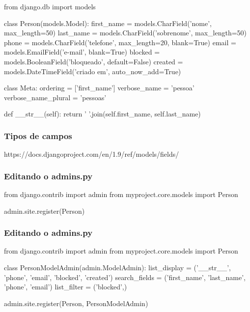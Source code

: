 \documentclass{beamer}
\begin{document}
{\begin{frame}[fragile]
\begin{pythoncode}
from django.db import models

class Person(models.Model):
    first_name = models.CharField('nome', max_length=50)
    last_name = models.CharField('sobrenome', max_length=50)
    phone = models.CharField('telefone', max_length=20, blank=True)
    email = models.EmailField('e-mail', blank=True)
    blocked = models.BooleanField('bloqueado', default=False)
    created = models.DateTimeField('criado em', auto_now_add=True)

    class Meta:
        ordering = ['first_name']
        verbose_name = 'pessoa'
        verbose_name_plural = 'pessoas'

    def __str__(self):
        return ' '.join(self.first_name, self.last_name)
\end{pythoncode}

\end{frame}

\begin{frame}\frametitle{Tipos de campos}
  \begin{center}
    \large https://docs.djangoproject.com/en/1.9/ref/models/fields/
  \end{center}
\end{frame}

\begin{frame}[fragile]\frametitle{Editando o admins.py}

\begin{pythoncode}
from django.contrib import admin
from myproject.core.models import Person

admin.site.register(Person)
\end{pythoncode}

\end{frame}

\begin{frame}[fragile]\frametitle{Editando o admins.py}

\begin{pythoncode}
from django.contrib import admin
from myproject.core.models import Person

class PersonModelAdmin(admin.ModelAdmin):
    list_display = ('__str__', 'phone', 'email',
                    'blocked', 'created')
    search_fields = ('first_name', 'last_name',
                     'phone', 'email')
    list_filter = ('blocked',)

admin.site.register(Person, PersonModelAdmin)
\end{pythoncode}


\end{frame}}
\end{document}
